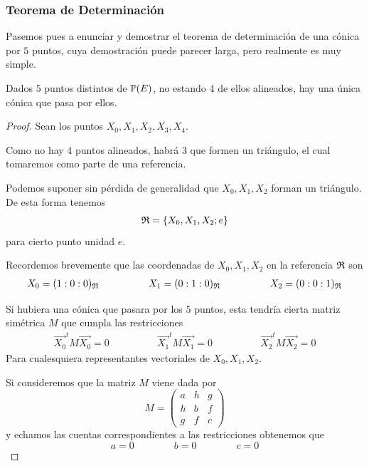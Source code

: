 \subsubsection{Teorema de Determinación}
Pasemos pues a enunciar y demostrar el teorema de determinación de una cónica por $5$ puntos, cuya demostración puede parecer larga, pero realmente es muy simple.
\begin{theo}
	\label{C8_teo_determinacion}
	Dados $5$ puntos distintos de $\mathbb{P}(E)$, no estando $4$ de ellos alineados, hay una única cónica que pasa por ellos.
\end{theo}
\begin{proof}
	Sean los puntos $X_0,X_1,X_2,X_3,X_4$.
	
	Como no hay $4$ puntos alineados, habrá $3$ que formen un triángulo, el cual tomaremos como parte de una referencia.
	
	Podemos suponer sin pérdida de generalidad que $X_0,X_1,X_2$ forman un triángulo. De esta forma tenemos
	\begin{equation}
		\mathfrak{R}=\{X_0,X_1,X_2;e\}
	\end{equation}
	para cierto punto unidad $e$.
	
	Recordemos brevemente que las coordenadas de $X_0,X_1,X_2$ en la referencia $\mathfrak{R}$ son
	\begin{equation*}
		\begin{array}{ccc}
			X_0=(1:0:0)_{\mathfrak{R}}\qquad &\qquad X_1=(0:1:0)_{\mathfrak{R}} \qquad&\qquad X_2=(0:0:1)_{\mathfrak{R}}
		\end{array}
	\end{equation*}
	
	Si hubiera una cónica que pasara por los $5$ puntos, esta tendría cierta matriz simétrica $M$ que cumpla las restricciones
	\begin{equation}
		\begin{array}{ccc}
		\vec{X_0}^tM\vec{X_0}=0\qquad&\qquad
		\vec{X_1}^tM\vec{X_1}=0\qquad&\qquad
		\vec{X_2}^tM\vec{X_2}=0
		\end{array}
	\end{equation}
	Para cualesquiera representantes vectoriales de $X_0,X_1,X_2$.
	
	Si consideremos que la matriz $M$ viene dada por
	\begin{equation*}
		M=\begin{pmatrix}
			a & h & g\\
			h & b & f\\
			g & f & c
		\end{pmatrix}
	\end{equation*}
	y echamos las cuentas correspondientes a las restricciones obtenemos que
	\begin{equation*}
		a=0\qquad\qquad b=0\qquad\qquad c=0
	\end{equation*}


\end{proof}
